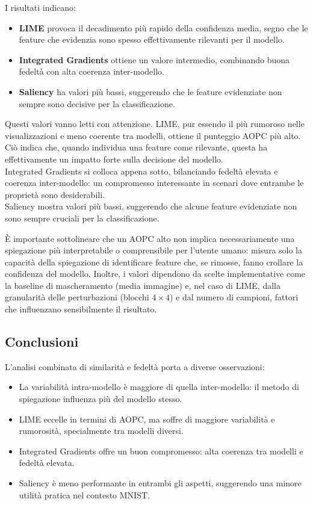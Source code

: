 \documentclass{article}
\begin{document}
\noindent
I risultati indicano:
\begin{itemize}
      \item \textbf{LIME} provoca il decadimento più rapido della confidenza media, segno che le feature che evidenzia sono spesso effettivamente rilevanti per il modello.
      \item \textbf{Integrated Gradients} ottiene un valore intermedio, combinando buona fedeltà con alta coerenza inter-modello.
      \item \textbf{Saliency} ha valori più bassi, suggerendo che le feature evidenziate non sempre sono decisive per la classificazione.
\end{itemize}

\noindent
Questi valori vanno letti con attenzione. LIME, pur essendo il più rumoroso nelle visualizzazioni e meno coerente tra modelli, ottiene il punteggio AOPC più alto.
Ciò indica che, quando individua una feature come rilevante, questa ha effettivamente un impatto forte sulla decisione del modello.\\
Integrated Gradients si colloca appena sotto, bilanciando fedeltà elevata e coerenza inter-modello: un compromesso interessante in scenari dove entrambe le proprietà sono desiderabili.\\
Saliency mostra valori più bassi, suggerendo che alcune feature evidenziate non sono sempre cruciali per la classificazione.

È importante sottolineare che un AOPC alto non implica necessariamente una spiegazione più interpretabile o comprensibile per l’utente umano: misura solo la capacità della spiegazione di identificare feature che, se rimosse, fanno crollare la confidenza del modello.
Inoltre, i valori dipendono da scelte implementative come la baseline di mascheramento (media immagine) e, nel caso di LIME, dalla granularità delle perturbazioni (blocchi $4\times4$) e dal numero di campioni, fattori che influenzano sensibilmente il risultato.

\subsection{Conclusioni}
L’analisi combinata di similarità e fedeltà porta a diverse osservazioni:
\begin{itemize}
      \item La variabilità intra-modello è maggiore di quella inter-modello: il metodo di
            spiegazione influenza più del modello stesso.
      \item LIME eccelle in termini di AOPC, ma soffre di maggiore variabilità e
            rumorosità, specialmente tra modelli diversi.
      \item Integrated Gradients offre un buon compromesso: alta coerenza tra modelli e
            fedeltà elevata.
      \item Saliency è meno performante in entrambi gli aspetti, suggerendo una minore
            utilità pratica nel contesto MNIST.
\end{itemize}



\end{document}
